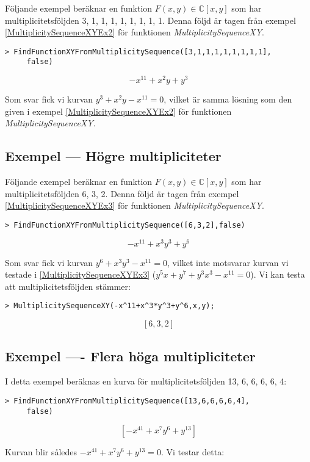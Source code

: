 Följande exempel beräknar en funktion $F(x, y) \in \mathbb{C}[x, y]$ som har multiplicitetsföljden 3, 1, 1, 1, 1, 1, 1, 1, 1. Denna följd är tagen från exempel \ref{MultiplicitySequenceXYEx2} för funktionen \emph{MultiplicitySequenceXY}.

\begin{verbatim}
> FindFunctionXYFromMultiplicitySequence([3,1,1,1,1,1,1,1,1],
     false)
\end{verbatim}
\[-x^{11}+x^2y+y^3\]

Som svar fick vi kurvan $y^3 + x^2y - x^{11} = 0$, vilket är samma lösning som den given i exempel \ref{MultiplicitySequenceXYEx2} för funktionen \emph{MultiplicitySequenceXY}.

\subsection{Exempel --- Högre multipliciteter}

Följande exempel beräknar en funktion $F(x, y) \in \mathbb{C}[x, y]$ som har multiplicitetsföljden 6, 3, 2. Denna följd är tagen från exempel \ref{MultiplicitySequenceXYEx3} för funktionen \emph{MultiplicitySequenceXY}.

\begin{verbatim}
> FindFunctionXYFromMultiplicitySequence([6,3,2],false)
\end{verbatim}
\[-x^{11}+x^3y^3+y^6\]

Som svar fick vi kurvan $y^6+x^3y^3-x^{11} = 0$, vilket inte motsvarar kurvan vi testade i \ref{MultiplicitySequenceXYEx3} ($y^5x+y^7+y^3x^3-x^{11} = 0$). Vi kan testa att multiplicitetsföljden stämmer:

\begin{verbatim}
> MultiplicitySequenceXY(-x^11+x^3*y^3+y^6,x,y);
\end{verbatim}
\[[6, 3, 2]\]

\subsection{Exempel ---- Flera höga multipliciteter}

I detta exempel beräknas en kurva för multiplicitetsföljden 13, 6, 6, 6, 6, 4:

\begin{verbatim}
> FindFunctionXYFromMultiplicitySequence([13,6,6,6,6,4], 
     false)
\end{verbatim}
\[\left[-x^{41}+x^7y^6+y^{13}\right]\]

Kurvan blir således $-x^{41}+x^7y^6+y^{13} = 0$. Vi testar detta:

